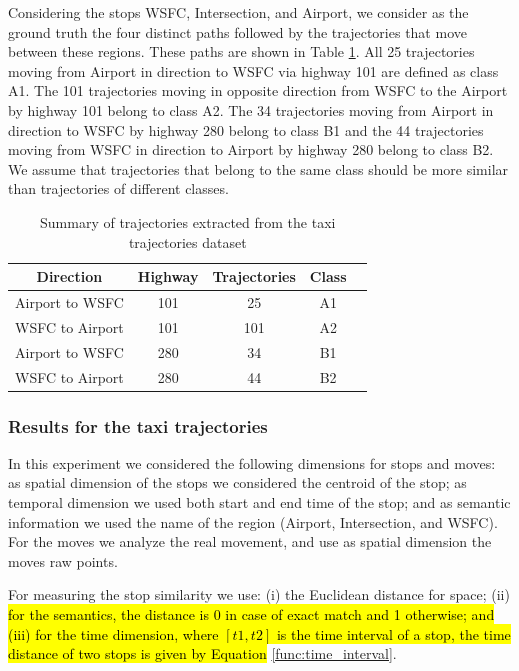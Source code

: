 \documentclass[12pt]{article}
\begin{document}
Considering the stops WSFC, Intersection, and Airport, we consider as the ground truth the four distinct paths followed by the trajectories that move between these regions. These paths are shown in Table \ref{tab:san_francisco_dataset}. All 25 trajectories moving from Airport in direction to WSFC via highway 101 are defined as class A1. The 101 trajectories moving in opposite direction from WSFC to the Airport by highway 101 belong to class A2. The 34 trajectories moving from Airport in direction to WSFC by highway 280 belong to class B1 and the 44 trajectories moving from WSFC in direction to Airport by highway 280 belong to class B2. We assume that trajectories that belong to the same class should be more similar than trajectories of different classes.

\begin{table}[h]
\scriptsize
  \centering
  \begin{tabular}{|c|c|c|c|c|}
  	\hline
 Direction & Highway & Trajectories & Class \\
  	\hline
 Airport to WSFC & 101 & 25 & A1\\
 WSFC to Airport & 101 & 101 & A2\\
 Airport to WSFC & 280 & 34 & B1\\
 WSFC to Airport & 280 & 44 & B2\\
    \hline
  \end{tabular}
  \caption{Summary of trajectories extracted from the taxi trajectories dataset}
  \label{tab:san_francisco_dataset}
\end{table}

\subsubsection{Results for the taxi trajectories}

In this experiment we considered the following dimensions for stops and moves: as spatial dimension of the stops we considered the centroid of the stop; as temporal dimension we used both start and end time of the stop; and as semantic information we used the name of the region (Airport, Intersection, and WSFC). For the moves we analyze the real movement, and use as spatial dimension the moves raw points.

For measuring the stop similarity we use: (i) the Euclidean distance for space; (ii)\hl{ for the semantics, the distance is 0 in case of exact match and 1 otherwise; and (iii) for the time dimension, where $[t1, t2]$ is the time interval of a stop, the time distance of two stops is given by  Equation} \ref{func:time_interval}.
\end{document}

